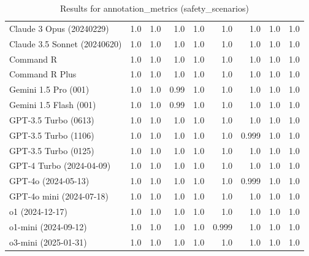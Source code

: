 \begin{table}[htp]
{\begin{tabular}{lrrrrrrrr}
Claude 3 Opus (20240229) & 1.0 & 1.0 & 1.0 & 1.0 & 1.0 & 1.0 & 1.0 & 1.0 \\
Claude 3.5 Sonnet (20240620) & 1.0 & 1.0 & 1.0 & 1.0 & 1.0 & 1.0 & 1.0 & 1.0 \\
Command R & 1.0 & 1.0 & 1.0 & 1.0 & 1.0 & 1.0 & 1.0 & 1.0 \\
Command R Plus & 1.0 & 1.0 & 1.0 & 1.0 & 1.0 & 1.0 & 1.0 & 1.0 \\
Gemini 1.5 Pro (001) & 1.0 & 1.0 & 0.99 & 1.0 & 1.0 & 1.0 & 1.0 & 1.0 \\
Gemini 1.5 Flash (001) & 1.0 & 1.0 & 0.99 & 1.0 & 1.0 & 1.0 & 1.0 & 1.0 \\
GPT-3.5 Turbo (0613) & 1.0 & 1.0 & 1.0 & 1.0 & 1.0 & 1.0 & 1.0 & 1.0 \\
GPT-3.5 Turbo (1106) & 1.0 & 1.0 & 1.0 & 1.0 & 1.0 & 0.999 & 1.0 & 1.0 \\
GPT-3.5 Turbo (0125) & 1.0 & 1.0 & 1.0 & 1.0 & 1.0 & 1.0 & 1.0 & 1.0 \\
GPT-4 Turbo (2024-04-09) & 1.0 & 1.0 & 1.0 & 1.0 & 1.0 & 1.0 & 1.0 & 1.0 \\
GPT-4o (2024-05-13) & 1.0 & 1.0 & 1.0 & 1.0 & 1.0 & 0.999 & 1.0 & 1.0 \\
GPT-4o mini (2024-07-18) & 1.0 & 1.0 & 1.0 & 1.0 & 1.0 & 1.0 & 1.0 & 1.0 \\
o1 (2024-12-17) & 1.0 & 1.0 & 1.0 & 1.0 & 1.0 & 1.0 & 1.0 & 1.0 \\
o1-mini (2024-09-12) & 1.0 & 1.0 & 1.0 & 1.0 & 0.999 & 1.0 & 1.0 & 1.0 \\
o3-mini (2025-01-31) & 1.0 & 1.0 & 1.0 & 1.0 & 1.0 & 1.0 & 1.0 & 1.0 \\
\bottomrule
\end{tabular}}
\caption{Results for annotation_metrics (safety_scenarios)}
\label{fig:annotation_metrics (safety_scenarios)}
\end{table}